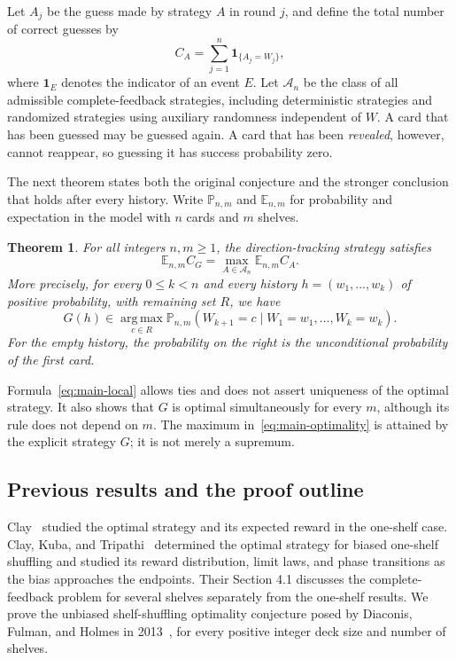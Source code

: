 \documentclass[11pt,reqno]{amsart}
\numberwithin{equation}{section}
\newtheorem{theorem}{Theorem}[section]
\theoremstyle{definition}
\theoremstyle{remark}
\begin{document}
Let $A_j$ be the guess made by strategy $A$ in round $j$, and define the total number of correct guesses by
\[
 C_A=\sum_{j=1}^n\mathbf1_{\{A_j=W_j\}},
\]
where $\mathbf1_E$ denotes the indicator of an event $E$. Let $\mathcal A_n$ be the class of all admissible complete-feedback strategies, including deterministic strategies and randomized strategies using auxiliary randomness independent of $W$. A card that has been guessed may be guessed again. A card that has been \emph{revealed}, however, cannot reappear, so guessing it has success probability zero.

The next theorem states both the original conjecture and the stronger conclusion that holds after every history. Write $\mathbb P_{n,m}$ and $\mathbb E_{n,m}$ for probability and expectation in the model with $n$ cards and $m$ shelves.
\begin{theorem}\label{thm:shelf}
For all integers $n,m\ge1$, the direction-tracking strategy satisfies
\begin{equation}\label{eq:main-optimality}
\mathbb E_{n,m}C_G
=\max_{A\in\mathcal A_n}\mathbb E_{n,m}C_A.
\end{equation}
More precisely, for every $0\le k<n$ and every history $h=(w_1,\ldots,w_k)$ of positive probability, with remaining set $R$, we have
\begin{equation}\label{eq:main-local}
G(h)\in\operatorname*{arg\,max}_{c\in R}
\mathbb P_{n,m}(W_{k+1}=c\mid W_1=w_1,\ldots,W_k=w_k).
\end{equation}
For the empty history, the probability on the right is the unconditional probability of the first card.
\end{theorem}
Formula~\eqref{eq:main-local} allows ties and does not assert uniqueness of the optimal strategy. It also shows that $G$ is optimal simultaneously for every $m$, although its rule does not depend on $m$. The maximum in~\eqref{eq:main-optimality} is attained by the explicit strategy $G$; it is not merely a supremum.
\subsection{Previous results and the proof outline}
Clay~\cite[Theorems 1.4 and 1.5]{Clay} studied the optimal strategy and its expected reward in the one-shelf case. Clay, Kuba, and Tripathi~\cite{CKT} determined the optimal strategy for biased one-shelf shuffling and studied its reward distribution, limit laws, and phase transitions as the bias approaches the endpoints. Their Section 4.1 discusses the complete-feedback problem for several shelves separately from the one-shelf results. We prove the unbiased shelf-shuffling optimality conjecture posed by Diaconis, Fulman, and Holmes in 2013~\cite[Section 5.1]{DFH}, for every positive integer deck size and number of shelves.
\end{document}
